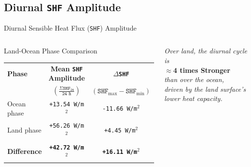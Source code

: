 \documentclass[8pt, aspectratio=169]{beamer}
\begin{document}
\subsection{Diurnal \texttt{SHF} Amplitude} %
\begin{frame}{Diurnal Sensible Heat Flux (\texttt{SHF}) Amplitude}
    \vspace{-0.5cm}
    \begin{columns}[T]
        \footnotesize
        \begin{block}{Land-Ocean Phase Comparison}
            \centering
            \begin{tabular}{lcc}
                \toprule
            \textbf{Phase} & \textbf{Mean \texttt{SHF} Amplitude} & \textbf{\(\Delta\)\texttt{SHF}} \\
                               &  \texttt{$\left(\frac{\Sigma \texttt{SHF}_{\texttt{24}}}{\texttt{24 h}}\right)$} &  \texttt{$\left(\texttt{SHF}_{\text{max}} - \texttt{SHF}_{\text{min}}\right)$} \\
                \midrule
                Ocean phase & \texttt{+13.54 W/m$^2$} & \texttt{-11.66 W/m$^2$} \\
                Land phase  & \texttt{+56.26 W/m$^2$} & \texttt{+4.45 W/m$^2$} \\
                \midrule
                \textbf{Difference} & \textbf{\texttt{+42.72 W/m$^2$}} & \textbf{\texttt{+16.11 W/m$^2$}} \\
                \bottomrule
            \end{tabular}
        \end{block}

        \vspace{0.8cm}
        \begin{center}
            \footnotesize
            \textit{Over land, the diurnal cycle is} \\
            \large \textbf{$\approx$4 times Stronger} \\
            \footnotesize \textit{than over the ocean,\\ driven by the land surface's lower heat capacity.}
        \end{center}
    \end{columns}


\end{frame}
\end{document}
